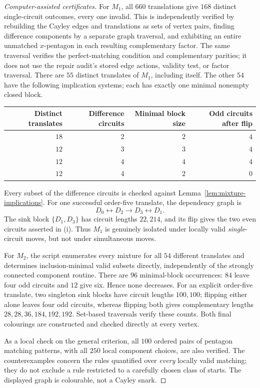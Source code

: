 \documentclass[11pt,a4paper]{article}
\theoremstyle{definition}
\theoremstyle{remark}
\begin{document}
\begin{proof}[Computer-assisted certificates]
For $M_1$, all $660$ translations give $168$ distinct single-circuit outcomes, every one invalid.  This is independently verified by rebuilding the Cayley edges and translations as sets of vertex pairs, finding difference components by a separate graph traversal, and exhibiting an entire unmatched $x$-pentagon in each resulting complementary factor.  The same traversal verifies the perfect-matching condition and complementary parities; it does not use the repair audit's stored edge actions, validity test, or factor traversal.  There are $55$ distinct translates of $M_1$, including itself.  The other $54$ have the following implication systems; each has exactly one minimal nonempty closed block.
\begin{center}
\begin{tabular}{@{}rrrr@{}}
\toprule
Distinct translates & Difference circuits & Minimal block size & Odd circuits after flip\\
\midrule
$18$ & $2$ & $2$ & $4$\\
$12$ & $3$ & $3$ & $4$\\
$12$ & $4$ & $4$ & $4$\\
$12$ & $4$ & $2$ & $0$\\
\bottomrule
\end{tabular}
\end{center}
Every subset of the difference circuits is checked against Lemma~\ref{lem:mixture-implications}.  For one successful order-five translate, the dependency graph is
\[
 D_0\longleftrightarrow D_2\longrightarrow D_3\longleftrightarrow D_1.
\]
The sink block $\{D_1,D_3\}$ has circuit lengths $22,214$, and its flip gives the two even circuits asserted in \textup{(i)}.  Thus $M_1$ is genuinely isolated under locally valid \emph{single}-circuit moves, but not under simultaneous moves.

For $M_2$, the script enumerates every mixture for all $54$ different translates and determines inclusion-minimal valid subsets directly, independently of the strongly connected component routine.  There are $96$ minimal-block occurrences: $84$ leave four odd circuits and $12$ give six.  Hence none decreases.  For an explicit order-five translate, two singleton sink blocks have circuit lengths $100,100$; flipping either alone leaves four odd circuits, whereas flipping both gives complementary lengths $28,28,36,184,192,192$.  Set-based traversals verify these counts.  Both final colourings are constructed and checked directly at every vertex.

As a local check on the general criterion, all $100$ ordered pairs of pentagon matching patterns, with all $250$ local component choices, are also verified.  The counterexamples concern the rules quantified over \emph{every} locally valid matching; they do not exclude a rule restricted to a carefully chosen class of starts.  The displayed graph is colourable, not a Cayley snark.
\end{proof}
\end{document}
